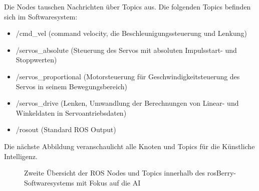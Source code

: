 \documentclass[conference]{IEEEtran}
\begin{document}
	Die Nodes tauschen Nachrichten über Topics aus.
	Die folgenden Topics befinden sich im Softwaresystem:
	\begin{itemize}
		\item /cmd\_vel (command velocity, die Beschleunigungssteuerung und 
		Lenkung)
		\item /servos\_absolute (Steuerung des Servos mit absoluten Impulsstart- und Stoppwerten)
		\item /servos\_proportional (Motorsteuerung für Geschwindigkeitsteuerung des Servos in seinem Bewegungsbereich)
		\item /servos\_drive (Lenken, Umwandlung der Berechnungen von Linear- und Winkeldaten in Servoantriebsdaten)
		\item /rosout (Standard ROS Output)
	\end{itemize}

	Die nächste Abbildung veranschaulicht alle Knoten und Topics für die 
	Künstliche Intelligenz. 

	\begin{figure}[!ht] 
		\centering
		\def\svgwidth{\linewidth}
		
		\caption{Zweite Übersicht der ROS Nodes und Topics innerhalb des rosBerry-Softwaresystems mit Fokus auf die AI}
		\label{AI-Only}
	\end{figure}
\end{document}
